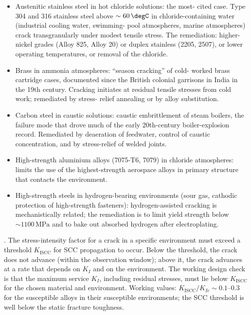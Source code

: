 \begin{itemize}[leftmargin=*]
\item Austenitic stainless steel in hot chloride solutions: the most-
  cited case. Type 304 and 316 stainless steel above $\sim 60\,\degC$
  in chloride-containing water (industrial cooling water, swimming-
  pool atmospheres, marine atmospheres) crack transgranularly under
  modest tensile stress. The remediation: higher-nickel grades (Alloy
  825, Alloy 20) or duplex stainless (2205, 2507), or lower
  operating temperatures, or removal of the chloride.
\item Brass in ammonia atmospheres: ``season cracking'' of cold-
  worked brass cartridge cases, documented since the British colonial
  garrisons in India in the 19th century. Cracking initiates at
  residual tensile stresses from cold work; remediated by stress-
  relief annealing or by alloy substitution.
\item Carbon steel in caustic solutions: caustic embrittlement of
  steam boilers, the failure mode that drove much of the early
  20th-century boiler-explosion record. Remediated by deaeration of
  feedwater, control of caustic concentration, and by stress-relief
  of welded joints.
\item High-strength aluminium alloys (7075-T6, 7079) in chloride
  atmospheres: limits the use of the highest-strength aerospace alloys
  in primary structure that contacts the environment.
\item High-strength steels in hydrogen-bearing environments (sour gas,
  cathodic protection of high-strength fasteners): hydrogen-assisted
  cracking is mechanistically related; the remediation is to limit
  yield strength below $\sim 1100\,\text{MPa}$ and to bake out
  absorbed hydrogen after electroplating.
\end{itemize}

. The stress-intensity
factor for a crack in a specific environment must exceed a threshold
$K_{\text{ISCC}}$ for SCC propagation to occur. Below the threshold,
the crack does not advance (within the observation window); above it,
the crack advances at a rate that depends on $K_I$ and on the
environment. The working design check is that the maximum service
$K_I$, including residual stresses, must lie below $K_{\text{ISCC}}$
for the chosen material and environment. Working values:
$K_{\text{ISCC}}/K_{Ic} \sim 0.1$--$0.3$ for the susceptible alloys
in their susceptible environments; the SCC threshold is well below
the static fracture toughness.

